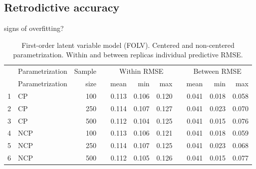 
\subsection{Retrodictive accuracy}

signs of overfitting?


\begin{table}[H]
	\centering
	\begin{tabular}{rlrrrrrrrrr}
		\hline
		& Parametrization & Sample && \multicolumn{3}{c}{ Within RMSE } && \multicolumn{3}{c}{ Between RMSE } \\
		\cmidrule(rl){5-7} \cmidrule(rl){9-11}  
		& Parametrization & size  && mean & min & max && mean & min & max \\ 
		\hline\hline
		1 & CP & 100 && 0.113 & 0.106 & 0.120 && 0.041 & 0.018 & 0.058 \\ 
		2 & CP & 250 && 0.114 & 0.107 & 0.127 && 0.041 & 0.023 & 0.070 \\
		3 & CP & 500 && 0.112 & 0.104 & 0.125 && 0.041 & 0.015 & 0.076 \\
		4 & NCP & 100 && 0.113 & 0.106 & 0.121 && 0.041 & 0.018 & 0.059 \\ 
		5 & NCP & 250 && 0.114 & 0.107 & 0.125 && 0.041 & 0.023 & 0.068 \\ 
		6 & NCP & 500 && 0.112 & 0.105 & 0.126 && 0.041 & 0.015 & 0.077 \\
		\hline
	\end{tabular}
	\caption[First-order latent variable model (FOLV). Centered and non-centered parametrization. Within and between replicas predictive RMSE.]%
	{First-order latent variable model (FOLV). Centered and non-centered parametrization. Within and between replicas individual predictive RMSE.}
	\label{tab:FOLV_accuracy}
\end{table}

